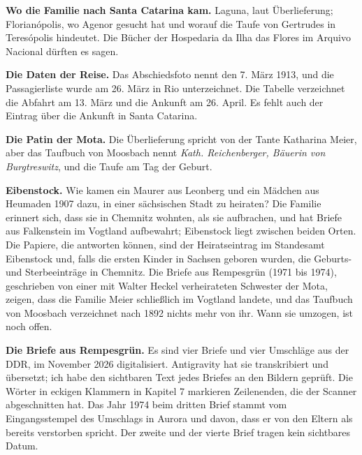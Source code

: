 \documentclass[
  ngerman,
  11pt,
  openany]{book}
\begin{document}
\textbf{Wo die Familie nach Santa Catarina kam.} Laguna, laut
Überlieferung; Florianópolis, wo Agenor gesucht hat und worauf die Taufe
von Gertrudes in Teresópolis hindeutet. Die Bücher der Hospedaria da
Ilha das Flores im Arquivo Nacional dürften es sagen.

\textbf{Die Daten der Reise.} Das Abschiedsfoto nennt den 7. März 1913,
und die Passagierliste wurde am 26. März in Rio unterzeichnet. Die
Tabelle verzeichnet die Abfahrt am 13. März und die Ankunft am 26.
April. Es fehlt auch der Eintrag über die Ankunft in Santa Catarina.

\textbf{Die Patin der Mota.} Die Überlieferung spricht von der Tante
Katharina Meier, aber das Taufbuch von Moosbach nennt \emph{Kath.
Reichenberger, Bäuerin von Burgtreswitz}, und die Taufe am Tag der
Geburt.

\textbf{Eibenstock.} Wie kamen ein Maurer aus Leonberg und ein Mädchen
aus Heumaden 1907 dazu, in einer sächsischen Stadt zu heiraten? Die
Familie erinnert sich, dass sie in Chemnitz wohnten, als sie aufbrachen,
und hat Briefe aus Falkenstein im Vogtland aufbewahrt; Eibenstock liegt
zwischen beiden Orten. Die Papiere, die antworten können, sind der
Heiratseintrag im Standesamt Eibenstock und, falls die ersten Kinder in
Sachsen geboren wurden, die Geburts- und Sterbeeinträge in Chemnitz. Die
Briefe aus Rempesgrün (1971 bis 1974), geschrieben von einer mit Walter
Heckel verheirateten Schwester der Mota, zeigen, dass die Familie Meier
schließlich im Vogtland landete, und das Taufbuch von Moosbach
verzeichnet nach 1892 nichts mehr von ihr. Wann sie umzogen, ist noch
offen.

\textbf{Die Briefe aus Rempesgrün.} Es sind vier Briefe und vier
Umschläge aus der DDR, im November 2026 digitalisiert. Antigravity hat
sie transkribiert und übersetzt; ich habe den sichtbaren Text jedes
Briefes an den Bildern geprüft. Die Wörter in eckigen Klammern in
Kapitel 7 markieren Zeilenenden, die der Scanner abgeschnitten hat. Das
Jahr 1974 beim dritten Brief stammt vom Eingangsstempel des Umschlags in
Aurora und davon, dass er von den Eltern als bereits verstorben spricht.
Der zweite und der vierte Brief tragen kein sichtbares Datum.
\end{document}
